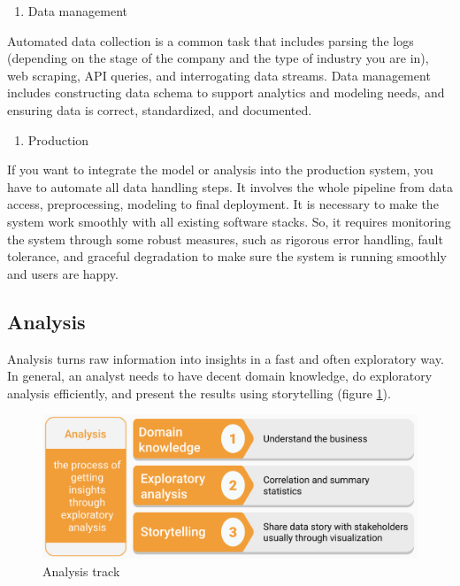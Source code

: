 \documentclass[
  12pt,
]{krantz}
\providecommand{\tightlist}{%
  \setlength{\itemsep}{0pt}\setlength{\parskip}{0pt}}
\begin{document}
\begin{enumerate}
\def\labelenumi{(\arabic{enumi})}
\setcounter{enumi}{1}
\tightlist
\item
  Data management
\end{enumerate}

Automated data collection is a common task that includes parsing the logs (depending on the stage of the company and the type of industry you are in), web scraping, API queries, and interrogating data streams. Data management includes constructing data schema to support analytics and modeling needs, and ensuring data is correct, standardized, and documented.

\begin{enumerate}
\def\labelenumi{(\arabic{enumi})}
\setcounter{enumi}{2}
\tightlist
\item
  Production
\end{enumerate}

If you want to integrate the model or analysis into the production system, you have to automate all data handling steps. It involves the whole pipeline from data access, preprocessing, modeling to final deployment. It is necessary to make the system work smoothly with all existing software stacks. So, it requires monitoring the system through some robust measures, such as rigorous error handling, fault tolerance, and graceful degradation to make sure the system is running smoothly and users are happy.

\hypertarget{analysis}{%
\subsection{Analysis}\label{analysis}}

Analysis turns raw information into insights in a fast and often exploratory way. In general, an analyst needs to have decent domain knowledge, do exploratory analysis efficiently, and present the results using storytelling (figure \ref{fig:track2analysis}).

\begin{figure}

{\centering \includegraphics[width=0.8\linewidth]{images/track2_analysis} 

}

\caption{Analysis track}\label{fig:track2analysis}
\end{figure}
\end{document}
